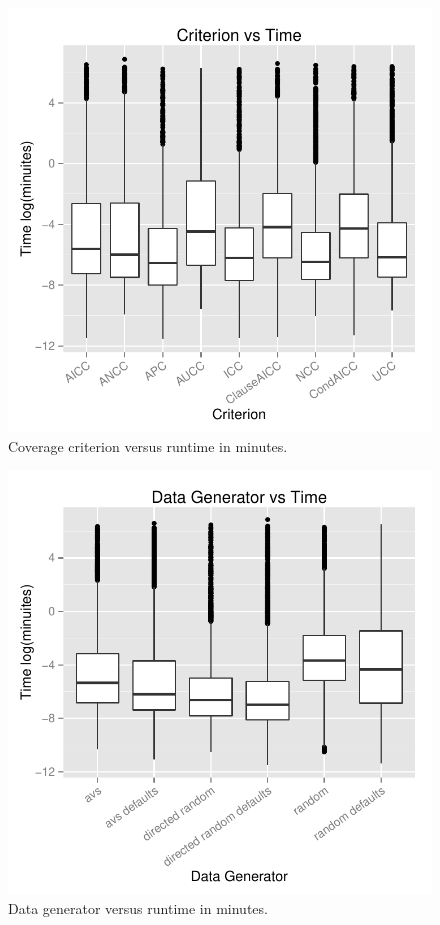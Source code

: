 \begin{figure}
\centering
  \centering
  \includegraphics[width=1\linewidth]{../diagrams/CriterionvsTime.pdf}
  \caption{Coverage criterion versus runtime in minutes.\vspace{-.15in}}
  \label{fig:crites}
  \vspace{-.15in} 
\end{figure}

\begin{figure}
\centering
  \centering
  \includegraphics[width=1\linewidth]{../diagrams/DataGeneratorvsTime.pdf}
  \caption{Data generator versus runtime in minutes.\vspace{-.15in}}
  \label{fig:crites}
  \vspace{-.15in} 
\end{figure}


